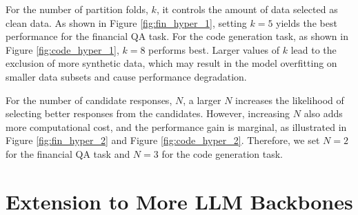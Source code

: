 For the number of partition folds, $k$, it controls the amount of data selected as clean data. As shown in Figure \ref{fig:fin_hyper_1}, setting $k=5$ yields the best performance for the financial QA task. 
For the code generation task, as shown in Figure \ref{fig:code_hyper_1}, $k=8$ performs best. 
Larger values of $k$ lead to the exclusion of more synthetic data, which may result in the model overfitting on smaller data subsets and cause performance degradation.

For the number of candidate responses, $N$, a larger $N$ increases the likelihood of selecting better responses from the candidates. 
However, increasing $N$ also adds more computational cost, and the performance gain is marginal, as illustrated in Figure \ref{fig:fin_hyper_2} and Figure \ref{fig:code_hyper_2}. Therefore, we set $N=2$ for the financial QA task and $N=3$ for the code generation task.



\section{Extension to More LLM Backbones}
\label{sec:ext_LLM}

